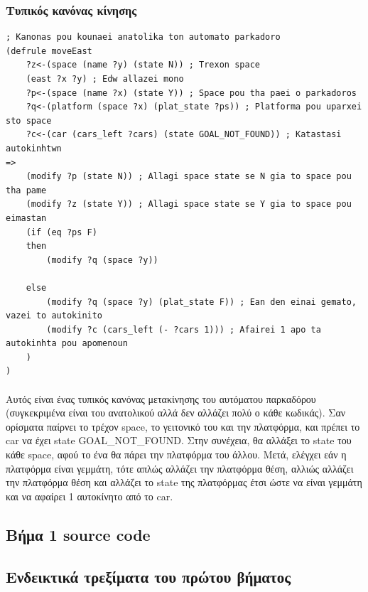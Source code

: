\documentclass{article}
\begin{document}
    \newpage
    \subsubsection{Τυπικός κανόνας κίνησης}
    \begin{lstlisting}[caption=Τυπικός κανόνας κίνησης]
; Kanonas pou kounaei anatolika ton automato parkadoro
(defrule moveEast
    ?z<-(space (name ?y) (state N)) ; Trexon space
    (east ?x ?y) ; Edw allazei mono
    ?p<-(space (name ?x) (state Y)) ; Space pou tha paei o parkadoros
    ?q<-(platform (space ?x) (plat_state ?ps)) ; Platforma pou uparxei sto space
    ?c<-(car (cars_left ?cars) (state GOAL_NOT_FOUND)) ; Katastasi autokinhtwn
=>
    (modify ?p (state N)) ; Allagi space state se N gia to space pou tha pame 
    (modify ?z (state Y)) ; Allagi space state se Y gia to space pou eimastan
    (if (eq ?ps F)
    then
        (modify ?q (space ?y))
        
    else
        (modify ?q (space ?y) (plat_state F)) ; Ean den einai gemato, vazei to autokinito
        (modify ?c (cars_left (- ?cars 1))) ; Afairei 1 apo ta autokinhta pou apomenoun
    )
)
    \end{lstlisting}

    \paragraph{}
    Αυτός είναι ένας τυπικός κανόνας μετακίνησης του αυτόματου παρκαδόρου (συγκεκριμένα είναι του ανατολικού αλλά δεν αλλάζει πολύ
    ο κάθε κωδικάς). Σαν ορίσματα παίρνει το τρέχον space, το γειτονικό του και την πλατφόρμα, και πρέπει το car να έχει state
    GOAL\_NOT\_FOUND. Στην συνέχεια, θα αλλάξει το state του κάθε space, αφού το ένα θα πάρει την πλατφόρμα του άλλου. Μετά,
    ελέγχει εάν η πλατφόρμα είναι γεμμάτη, τότε απλώς αλλάζει την πλατφόρμα θέση, αλλιώς αλλάζει την πλατφόρμα θέση και
    αλλάζει το state της πλατφόρμας έτσι ώστε να είναι γεμμάτη και να αφαίρει 1 αυτοκίνητο από το car.

    \newpage
    \subsection{Βήμα 1 source code}
    

    \newpage
    \subsection{Ενδεικτικά τρεξίματα του πρώτου βήματος}
\end{document}
